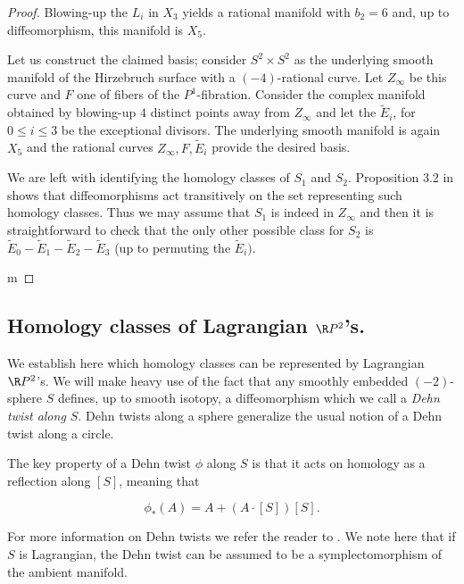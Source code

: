 \begin{proof}
Blowing-up the $L_i$ in $X_3$ yields a rational manifold with $b_2=6$ and, up to diffeomorphism, this manifold is $X_5$.\par

Let us construct the claimed basis; consider $S^2\times S^2$ as the underlying smooth manifold of the Hirzebruch surface with a $(-4)$-rational curve. Let $Z_\infty$ be this curve and $F$ one of fibers of the $P^1$-fibration. Consider the complex manifold obtained by blowing-up $4$ distinct points away from $Z_\infty$ and let the $\widetilde{E}_i$, for $0\leq i\leq 3$ be the exceptional divisors. The underlying smooth manifold is again $X_5$ and the rational curves $Z_\infty,F,\widetilde{E}_i$ provide the desired basis.\par 

We are left with identifying the homology classes of $S_1$ and $S_2$. Proposition 3.2 in \cite{BLW} shows that diffeomorphisms act transitively on the set representing such homology classes. Thus we may assume that $S_1$ is indeed in $Z_\infty$ and then it is straightforward to check that the only other possible class for $S_2$ is $\widetilde{E}_0-\widetilde{E}_1-\widetilde{E}_2-\widetilde{E}_3$ (up to permuting the $\widetilde{E}_i)$.


m
\end{proof}






\subsection{Homology classes of Lagrangian $\R P^2$'s.}
We establish here which homology classes can be represented by Lagrangian $\R P^2$'s. We will make heavy use of the fact that any smoothly embedded $(-2)$-sphere $S$ defines, up to smooth isotopy, a diffeomorphism which we call a \textit{Dehn twist along $S$}. Dehn twists along a sphere generalize the usual notion of a Dehn twist along a circle.\par

The key property of a Dehn twist $\phi$ along $S$ is that it acts on homology as a reflection along $[S]$, meaning that

\begin{equation}\label{homdehn}
 \phi_*(A)=A+(A\cdot [S])[S].   
\end{equation}


For more information on Dehn twists we refer the reader to \cite{BLW}. We note here that if $S$ is Lagrangian, the Dehn twist can be assumed to be a symplectomorphism of the ambient manifold.\par 

